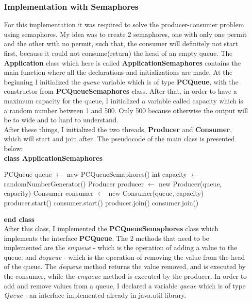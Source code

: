 \documentclass[14pt]{article}
\begin{document}
\subsubsection{Implementation with Semaphores}
For this implementation it was required to solve the producer-consumer problem using semaphores. My idea was to create 2 semaphores, one with only one permit and the other with no permit, such that, the consumer will definitely not start first, because it could not consume(return) the head of an empty queue. The \textbf{Application} class which here is called \textbf{ApplicationSemaphores} contains the main function where all the declarations and initializations are made. At the beginning I initialized the \textit{queue} variable which is of type \textbf{PCQueue}, with the constructor from \textbf{PCQueueSemaphores} class. After that, in order to have a maximum capacity for the queue, I initialized a variable called capacity which is a random number between 1 and 500. Only 500 because otherwise the output will be to wide and to hard to understand.
\vspace{2.5 mm}
\\After these things, I initialized the two threads, \textbf{Producer} and \textbf{Consumer}, which will start and join after. The pseudocode of the main class is presented below:
\vspace{2.5 mm}
\\\textbf{class ApplicationSemaphores}
\begin{algorithmic}
    \State PCQueue queue $\gets$ new PCQueueSemaphores()
    \State int capacity $\gets$ randomNumberGenerator()
    \State Producer producer $\gets$ new Producer(queue, capacity)
    \State Consumer consumer $\gets$ new Consumer(queue, capacity)
    \State producer.start()
    \State consumer.start()
    \State producer.join()
    \State consumer.join()
\EndFunction
\end{algorithmic}
\textbf{end class}
\vspace{2.5 mm}
\\After this class, I implemented the \textbf{PCQueueSemaphores} class which implements the interface \textbf{PCQueue}. The 2 methods that need to be implemented are the \textit{enqueue} - which is the operation of adding a value to the queue, and \textit{dequeue} - which is the operation of removing the value from the head of the queue. The \textit{dequeue} method returns the value removed, and is executed by the consumer, while the \textit{enqueue} method is executed by the producer. In order to add and remove values from a queue, I declared a variable \textit{queue} which is of type \textit{Queue} - an interface implemented already in java.util library.
\end{document}
